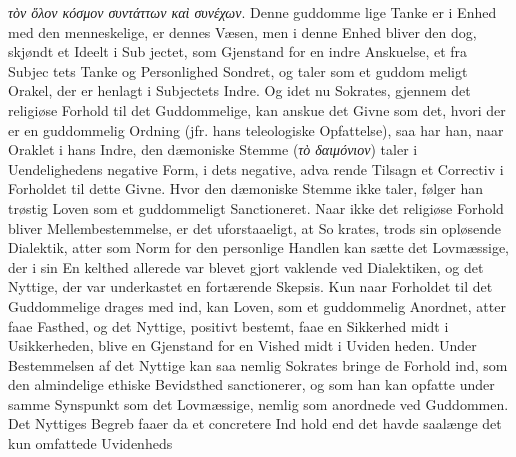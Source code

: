 \documentclass[12pt,a4paper]{book}
\newcommand{\gk}[1]{\textit{#1}}
\begin{document}
\gk{τὸν ὅλον κόσμον συντάττων καὶ συνέχων}. Denne guddomme\-%
lige Tanke er i Enhed med den menneskelige, er dennes Væsen,
men i denne Enhed bliver den dog, skjøndt et Ideelt i Sub\-%
jectet, som Gjenstand for en indre Anskuelse, et fra Subjec\-%
tets Tanke og Personlighed Sondret, og taler som et guddom\-%
meligt Orakel, der er henlagt i Subjectets Indre. Og idet nu
Sokrates, gjennem det religiøse Forhold til det Guddommelige,
kan anskue det Givne som det, hvori der er en guddommelig
Ordning (jfr. hans teleologiske Opfattelse), saa har han, naar
Oraklet i hans Indre, den dæmoniske Stemme (\gk{τὸ δαιμόνιον})
taler i Uendelighedens negative Form, i dets negative, adva\-%
rende Tilsagn et Correctiv i Forholdet til dette Givne. Hvor
den dæmoniske Stemme ikke taler, følger han trøstig Loven
som et guddommeligt Sanctioneret. Naar ikke det religiøse
Forhold bliver Mellembestemmelse, er det uforstaaeligt, at So\-%
krates, trods sin opløsende Dialektik, atter som Norm for den
personlige Handlen kan sætte det Lovmæssige, der i sin En\-%
kelthed allerede var blevet gjort vaklende ved Dialektiken, og
det Nyttige, der var underkastet en fortærende Skepsis. Kun
naar Forholdet til det Guddommelige drages med ind, kan
Loven, som et guddommelig Anordnet, atter faae Fasthed,
og det Nyttige, positivt bestemt, faae en Sikkerhed midt i
Usikkerheden, blive en Gjenstand for en Vished midt i Uviden\-%
heden. Under Bestemmelsen af det Nyttige kan saa nemlig
Sokrates bringe de Forhold ind, som den almindelige ethiske
Bevidsthed sanctionerer, og som han kan opfatte under samme
Synspunkt som det Lovmæssige, nemlig som anordnede ved
Guddommen. Det Nyttiges Begreb faaer da et concretere Ind\-%
hold end det havde saalænge det kun omfattede Uvidenheds\-%
\end{document}
